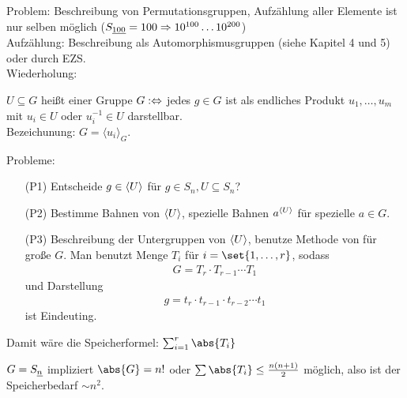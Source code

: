 Problem: Beschreibung von Permutationsgruppen, Aufzählung aller Elemente ist nur selben möglich ($S_{\uline{100}} = 100 \implies 10^{100} \dots 10^{200}$)\\
Aufzählung: Beschreibung als Automorphismusgruppen (siehe Kapitel 4 und 5) oder durch EZS.\\
Wiederholung:
\begin{definition}\label{sec3:def:generatingset}
	$U \subseteq G$ heißt  einer Gruppe $G :\Leftrightarrow$ jedes $g \in G$ ist als endliches Produkt $u_1, \dots, u_m$ mit $u_i \in U$ oder $u^{-1}_i \in U$ darstellbar.\\
	Bezeichunung: $G = \langle u_i \rangle_G$.
\end{definition}
Probleme:
\begin{itemize}
	\item[(P1)] Entscheide $g \in \langle U \rangle$ für $g \in S_n, U \subseteq S_n$?
	\item[(P2)] Bestimme Bahnen von $\langle U \rangle$, spezielle Bahnen $a^{\langle U \rangle}$ für spezielle $a \in G$.
	\item[(P3)] Beschreibung der Untergruppen von $\langle U \rangle$, benutze Methode von  für große $G$. Man benutzt Menge $T_i$ für $i =\set{1,\dots,r}$, sodass
	\begin{align*}
		G = T_r \cdot T_{r-1} \cdots T_1
	\end{align*}
	und Darstellung
	\begin{align*}
		g = t_r \cdot t_{r-1} \cdot t_{r-2}\cdots t_1
	\end{align*}
	ist Eindeuting.
\end{itemize}
Damit wäre die Speicherformel: $\sum_{i=1}^r \abs{T_i}$
\begin{*example}
	$G = S_{\uline{n}}$ impliziert $\abs{G} = n!$ oder $\sum \abs{T_i} \le \frac{n(n+1)}{2}$ möglich, also ist der Speicherbedarf $\sim n^2$.
\end{*example}
